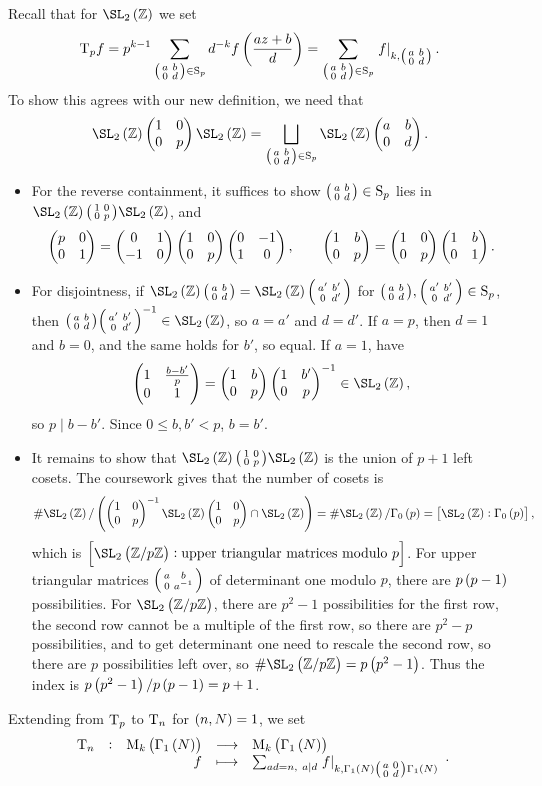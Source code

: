 Recall that for $ \SL_2\br{\ZZ} $ we set
$$ \T_pf = p^{k - 1}\sum_{\twobytwosmall{a}{b}{0}{d} \in \S_p} d^{-k}f\br{\dfrac{az + b}{d}} = \sum_{\twobytwosmall{a}{b}{0}{d} \in \S_p} \eval{f}_{k, \twobytwosmall{a}{b}{0}{d}}. $$
To show this agrees with our new definition, we need that
$$ \SL_2\br{\ZZ}\twobytwo{1}{0}{0}{p}\SL_2\br{\ZZ} = \bigsqcup_{\twobytwosmall{a}{b}{0}{d} \in \S_p} \SL_2\br{\ZZ}\twobytwo{a}{b}{0}{d}. $$
\begin{itemize}
\item For the reverse containment, it suffices to show $ \begin{psmallmatrix} a & b \\ 0 & d \end{psmallmatrix} \in \mathrm{S}_p $ lies in $ \SL_2\br{\ZZ}\twobytwosmall{1}{0}{0}{p}\SL_2\br{\ZZ} $, and
$$ \begin{pmatrix} p & 0 \\ 0 & 1 \end{pmatrix} = \begin{pmatrix} 0 & 1 \\ -1 & 0 \end{pmatrix}\begin{pmatrix} 1 & 0 \\ 0 & p \end{pmatrix}\begin{pmatrix} 0 & -1 \\ 1 & 0 \end{pmatrix}, \qquad \begin{pmatrix} 1 & b \\ 0 & p \end{pmatrix} = \begin{pmatrix} 1 & 0 \\ 0 & p \end{pmatrix}\begin{pmatrix} 1 & b \\ 0 & 1 \end{pmatrix}. $$
\item For disjointness, if $ \SL_2\br{\ZZ}\twobytwosmall{a}{b}{0}{d} = \SL_2\br{\ZZ}\twobytwosmall{a'}{b'}{0}{d'} $ for $ \begin{psmallmatrix} a & b \\ 0 & d \end{psmallmatrix}, \begin{psmallmatrix} a' & b' \\ 0 & d' \end{psmallmatrix} \in \mathrm{S}_p $, then $ \twobytwosmall{a}{b}{0}{d}\twobytwosmall{a'}{b'}{0}{d'}^{-1} \in \SL_2\br{\ZZ} $, so $ a = a' $ and $ d = d' $. If $ a = p $, then $ d = 1 $ and $ b = 0 $, and the same holds for $ b' $, so equal. If $ a = 1 $, have
$$ \twobytwo{1}{\tfrac{b - b'}{p}}{0}{1} = \twobytwo{1}{b}{0}{p}\twobytwo{1}{b'}{0}{p}^{-1} \in \SL_2\br{\ZZ}, $$
so $ p \mid b - b' $. Since $ 0 \le b, b' < p $, $ b = b' $.

\pagebreak

\item It remains to show that $ \SL_2\br{\ZZ}\twobytwosmall{1}{0}{0}{p}\SL_2\br{\ZZ} $ is the union of $ p + 1 $ left cosets. The coursework gives that the number of cosets is
$$ \#\SL_2\br{\ZZ} / \br{\twobytwo{1}{0}{0}{p}^{-1}\SL_2\br{\ZZ}\twobytwo{1}{0}{0}{p} \cap \SL_2\br{\ZZ}} = \#\SL_2\br{\ZZ} / \Gamma_0\br{p} = \sbr{\SL_2\br{\ZZ} : \Gamma_0\br{p}}, $$
which is $ \sbr{\SL_2\br{\ZZ / p\ZZ} : \text{upper triangular matrices modulo} \ p} $. For upper triangular matrices $ \begin{psmallmatrix} a & b \\ 0 & a^{-1} \end{psmallmatrix} $ of determinant one modulo $ p $, there are $ p\br{p - 1} $ possibilities. For $ \SL_2\br{\ZZ / p\ZZ} $, there are $ p^2 - 1 $ possibilities for the first row, the second row cannot be a multiple of the first row, so there are $ p^2 - p $ possibilities, and to get determinant one need to rescale the second row, so there are $ p $ possibilities left over, so $ \#\SL_2\br{\ZZ / p\ZZ} = p\br{p^2 - 1} $. Thus the index is $ p\br{p^2 - 1} / p\br{p - 1} = p + 1 $.
\end{itemize}
Extending from $ \mathrm{T}_p $ to $ \mathrm{T}_n $ for $ \br{n, N} = 1 $, we set
$$ \function[\T_n]{\M_k\br{\Gamma_1\br{N}}}{\M_k\br{\Gamma_1\br{N}}}{f}{\sum_{ad = n, \ a \mid d} \eval{f}_{k, \Gamma_1\br{N}\twobytwosmall{a}{0}{0}{d}\Gamma_1\br{N}}}. $$

